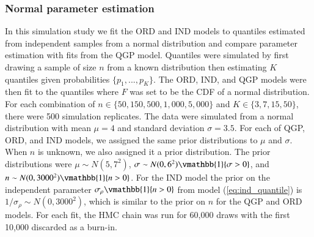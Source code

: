 \documentclass[preprint,12pt,authoryear]{elsarticle}
\begin{document}
\subsubsection{Normal parameter estimation}
In this simulation study we fit the ORD and IND models to quantiles estimated from independent samples from a normal distribution and compare parameter estimation with fits from the QGP model. Quantiles were simulated by first drawing a sample of size $n$ from a known distribution then estimating $K$ quantiles given probabilities $\{p_1, ..., p_K\}$. The ORD, IND, and QGP models were then fit to the quantiles where $F$ was set to be the CDF of a normal distribution. For each combination of $n \in \{50, 150, 500, 1{,}000, 5{,}000\}$ and $K \in \{3,7,15,50\}$, there were 500 simulation replicates. The data were simulated from a normal distribution with mean $\mu = 4$ and standard deviation $\sigma = 3.5$.
For each of QGP, ORD, and IND models, we assigned the same prior distributions 
to $\mu$ and $\sigma$. When $n$ is unknown, we also assigned it a prior 
distribution. The prior distributions were $\mu \sim N(5,7^2)$, 
$\sigma \sim N(0, 6^2) \vmathbb{1}\{\sigma > 0\}$, and
$n \sim N(0,3000^2)\vmathbb{1}\{n > 0\}$.
For the IND model the prior on the independent parameter $\sigma_{\rho}\vmathbb{1}\{n > 0\}$ from model (\ref{eq:ind_quantile}) is $1/\sigma_{\rho} \sim N(0, 3000^2)$, which is similar to the prior on $n$ for the QGP and ORD models. For each fit, the HMC chain was run for 60,000 draws with the first 10,000 discarded as a burn-in.
\end{document}
